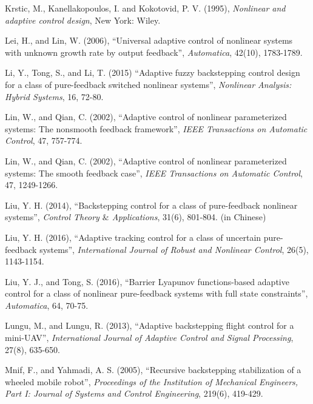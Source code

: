 \documentclass{tSYS2e}
\theoremstyle{plain}
\theoremstyle{definition}
\begin{document}
\begin{thebibliography}{99}
 Krstic, M.,
Kanellakopoulos, I. and Kokotovid, P. V. (1995), {\itshape Nonlinear and
adaptive control design}, New York: Wiley.

 Lei, H., and Lin, W. (2006),
``Universal adaptive control of nonlinear systems
with unknown growth rate by output feedback'', {\itshape Automatica}, 42(10), 1783-1789.

 Li, Y., Tong, S., and Li, T. (2015)
``Adaptive fuzzy backstepping control design for a class of pure-feedback
switched nonlinear systems'', {\itshape Nonlinear Analysis: Hybrid Systems}, 16, 72-80.

 Lin, W., and Qian, C. (2002), ``Adaptive control of nonlinear parameterized
systems: The nonsmooth feedback framework'', {\itshape IEEE Transactions on
Automatic Control}, 47, 757-774.

 Lin, W., and Qian, C. (2002), ``Adaptive control of nonlinear parameterized
systems: The smooth feedback case'', {\itshape IEEE Transactions on Automatic
Control}, 47, 1249-1266.

 Liu, Y. H. (2014), ``Backstepping control for a
class of pure-feedback nonlinear systems'', {\itshape Control Theory $\&$ Applications},
31(6), 801-804. (in Chinese)

 Liu, Y. H. (2016), ``Adaptive tracking control for a class of uncertain pure-feedback systems'',
{\itshape International Journal of Robust and Nonlinear Control}, 26(5), 1143-1154.

 Liu, Y. J., and Tong, S. (2016), ``Barrier Lyapunov functions-based adaptive control for a class of nonlinear pure-feedback systems with full state constraints'', {\itshape Automatica}, 64, 70-75.

 Lungu, M., and Lungu, R. (2013),
``Adaptive backstepping flight control for a mini-UAV'', {\itshape International Journal
of Adaptive Control and Signal Processing}, 27(8), 635-650.

 Mnif, F., and Yahmadi, A. S.
(2005), ``Recursive backstepping stabilization of a wheeled mobile robot'',
{\itshape Proceedings of the Institution of Mechanical Engineers, Part I: Journal of
Systems and Control Engineering}, 219(6), 419-429.


\end{thebibliography}
\end{document}
